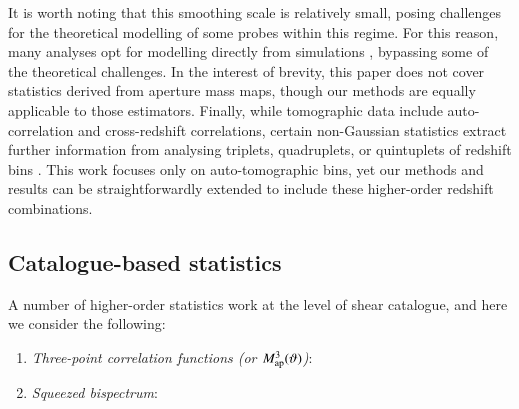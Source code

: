 It is worth noting that this smoothing scale is relatively small, posing challenges for  the theoretical modelling of some probes within this regime.
For this reason, many analyses opt for modelling directly from simulations \citep[see][]{HD21, DESY3_Zuercher, HSCY1_peaks_sims}, bypassing some of the theoretical challenges.
In the interest of brevity, this paper does not cover statistics derived from aperture mass maps, though our methods are equally applicable to those estimators.
Finally, while tomographic \gtwopcf data include auto-correlation and cross-redshift correlations, certain non-Gaussian statistics extract further information from analysing triplets, quadruplets, or quintuplets of redshift bins \citep{Martinet20}.
This work focuses only on auto-tomographic bins, yet our methods and results can be straightforwardly extended to include these higher-order redshift combinations.

 
 
\subsection{Catalogue-based statistics}

A number of higher-order statistics work at the level of shear catalogue,  and here we consider the following:
\begin{enumerate}
\item {\it Three-point correlation functions (or $M_{\rm ap}^3(\vartheta)$)}:  
\item {\it Squeezed bispectrum}: 
\end{enumerate}


